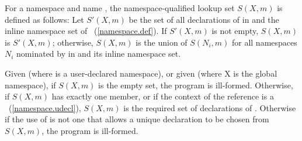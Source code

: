 \pnum
For a namespace  and name , the namespace-qualified lookup set
$S(X, m)$ is defined as follows: Let $S'(X, m)$ be the set of all
declarations of  in  and the inline namespace set of
~(\ref{namespace.def}). If $S'(X, m)$ is not empty, $S(X, m)$
is $S'(X, m)$; otherwise, $S(X, m)$ is the union of $S(N_i, m)$ for
all namespaces $N_i$ nominated by  in
 and its inline namespace set.

\pnum
Given  (where  is a user-declared namespace), or
given  (where X is the global namespace), if
$S(X, m)$ is the empty set, the program is ill-formed. Otherwise, if
$S(X, m)$ has exactly one member, or if the context of the reference is
a ~(\ref{namespace.udecl}), $S(X, m)$
is the
required set of declarations of . Otherwise if the use of
 is not one that allows a unique declaration to be chosen from
$S(X, m)$, the program is ill-formed. \enterexample

